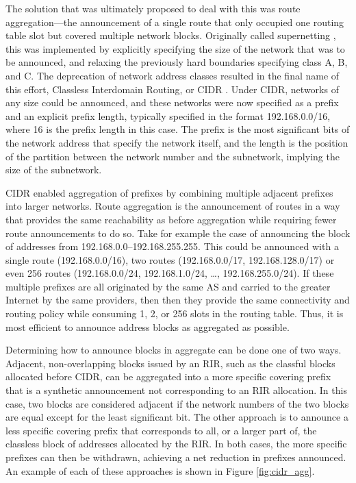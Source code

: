 %

The solution that was ultimately proposed to deal with this was route aggregation---the announcement of a single route that only occupied one routing table slot but covered multiple network blocks. Originally called supernetting \cite{rfc1338}, this was implemented by explicitly specifying the size of the network that was to be announced, and relaxing the previously hard boundaries specifying class A, B, and C. The deprecation of network address classes resulted in the final name of this effort, Classless Interdomain Routing, or CIDR \cite{rfc1519}. Under CIDR, networks of any size could be announced, and these networks were now specified as a prefix and an explicit prefix length, typically specified in the format 192.168.0.0/16, where 16 is the prefix length in this case. The prefix is the most significant bits of the network address that specify the network itself, and the length is the position of the partition between the network number and the subnetwork, implying the size of the subnetwork.

CIDR enabled aggregation of prefixes by combining multiple adjacent prefixes into larger networks. Route aggregation is the announcement of routes in a way that provides the same reachability as before aggregation while requiring fewer route announcements to do so. Take for example the case of announcing the block of addresses from 192.168.0.0--192.168.255.255. This could be announced with a single route (192.168.0.0/16), two routes (192.168.0.0/17, 192.168.128.0/17) or even 256 routes (192.168.0.0/24, 192.168.1.0/24, \ldots, 192.168.255.0/24). If these multiple prefixes are all originated by the same AS and carried to the greater Internet by the same providers, then then they provide the same connectivity and routing policy while consuming 1, 2, or 256 slots in the routing table. Thus, it is most efficient to announce address blocks as aggregated as possible.

Determining how to announce blocks in aggregate can be done one of two ways. Adjacent, non-overlapping blocks issued by an RIR, such as the classful blocks allocated before CIDR, can be aggregated into a more specific covering prefix that is a synthetic announcement not corresponding to an RIR allocation. In this case, two blocks are considered adjacent if the network numbers of the two blocks are equal except for the least significant bit. The other approach is to announce a less specific covering prefix that corresponds to all, or a larger part of, the classless block of addresses allocated by the RIR. In both cases, the more specific prefixes can then be withdrawn, achieving a net reduction in prefixes announced. An example of each of these approaches is shown in Figure \ref{fig:cidr_agg}.

